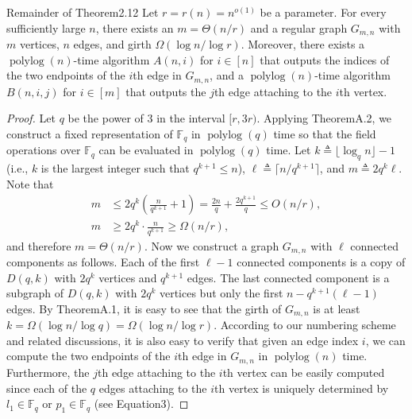 \begin{authorclaim}{Remainder of Theorem2.12}
Let $r=r(n)=n^{o(1)}$ be a parameter. For every sufficiently large $n$, there exists an $m=\Theta(n/r)$ and a regular graph $G_{m,n}$ with $m$ vertices, $n$ edges, and girth $\Omega(\log n/\log r)$. Moreover, there exists a $\operatorname{polylog}(n)$-time algorithm $A(n,i)$ for $i\in[n]$ that outputs the indices of the two endpoints of the $i$th edge in $G_{m,n}$, and a $\operatorname{polylog}(n)$-time algorithm $B(n,i,j)$ for $i\in[m]$ that outputs the $j$th edge attaching to the $i$th vertex.
\end{authorclaim}
\begin{proof}
Let $q$ be the power of 3 in the interval $[r,3r)$. Applying TheoremA.2, we construct a fixed representation of $\mathbb F_q$ in $\operatorname{polylog}(q)$ time so that the field operations over $\mathbb F_q$ can be evaluated in $\operatorname{polylog}(q)$ time. Let $k\triangleq\lfloor\log_qn\rfloor-1$ (i.e., $k$ is the largest integer such that $q^{k+1}\le n$), $\ell\triangleq\lceil n/q^{k+1}\rceil$, and $m\triangleq2q^k\ell$. Note that
\begin{align*}
m&\le2q^k\left(\frac n{q^{k+1}}+1\right)=\frac{2n}q+\frac{2q^{k+1}}q\le O(n/r),\\
m&\ge2q^k\cdot\frac n{q^{k+1}}\ge\Omega(n/r),
\end{align*}
and therefore $m=\Theta(n/r)$. Now we construct a graph $G_{m,n}$ with $\ell$ connected components as follows. Each of the first $\ell-1$ connected components is a copy of $D(q,k)$ with $2q^k$ vertices and $q^{k+1}$ edges. The last connected component is a subgraph of $D(q,k)$ with $2q^k$ vertices but only the first $n-q^{k+1}(\ell-1)$ edges.
By TheoremA.1, it is easy to see that the girth of $G_{m,n}$ is at least $k=\Omega(\log n/\log q)=\Omega(\log n/\log r)$. According to our numbering scheme and related discussions, it is also easy to verify that given an edge index $i$, we can compute the two endpoints of the $i$th edge in $G_{m,n}$ in $\operatorname{polylog}(n)$ time. Furthermore, the $j$th edge attaching to the $i$th vertex can be easily computed since each of the $q$ edges attaching to the $i$th vertex is uniquely determined by $l_1\in\mathbb F_q$ or $p_1\in\mathbb F_q$ (see Equation3).
\end{proof}
